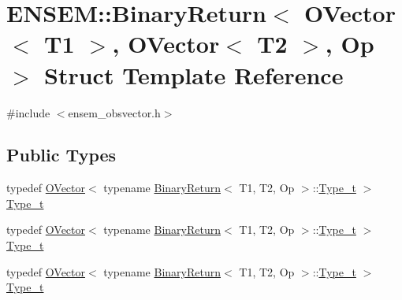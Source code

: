 \hypertarget{structENSEM_1_1BinaryReturn_3_01OVector_3_01T1_01_4_00_01OVector_3_01T2_01_4_00_01Op_01_4}{}\section{E\+N\+S\+EM\+:\+:Binary\+Return$<$ O\+Vector$<$ T1 $>$, O\+Vector$<$ T2 $>$, Op $>$ Struct Template Reference}
\label{structENSEM_1_1BinaryReturn_3_01OVector_3_01T1_01_4_00_01OVector_3_01T2_01_4_00_01Op_01_4}


{\ttfamily \#include $<$ensem\+\_\+obsvector.\+h$>$}

\subsection*{Public Types}
\begin{DoxyCompactItemize}
\item 
typedef \mbox{\hyperlink{classENSEM_1_1OVector}{O\+Vector}}$<$ typename \mbox{\hyperlink{structENSEM_1_1BinaryReturn}{Binary\+Return}}$<$ T1, T2, Op $>$\+::\mbox{\hyperlink{structENSEM_1_1BinaryReturn_3_01OVector_3_01T1_01_4_00_01OVector_3_01T2_01_4_00_01Op_01_4_a4736776d1b4c658230ffbd7a77aa772a}{Type\+\_\+t}} $>$ \mbox{\hyperlink{structENSEM_1_1BinaryReturn_3_01OVector_3_01T1_01_4_00_01OVector_3_01T2_01_4_00_01Op_01_4_a4736776d1b4c658230ffbd7a77aa772a}{Type\+\_\+t}}
\item 
typedef \mbox{\hyperlink{classENSEM_1_1OVector}{O\+Vector}}$<$ typename \mbox{\hyperlink{structENSEM_1_1BinaryReturn}{Binary\+Return}}$<$ T1, T2, Op $>$\+::\mbox{\hyperlink{structENSEM_1_1BinaryReturn_3_01OVector_3_01T1_01_4_00_01OVector_3_01T2_01_4_00_01Op_01_4_a4736776d1b4c658230ffbd7a77aa772a}{Type\+\_\+t}} $>$ \mbox{\hyperlink{structENSEM_1_1BinaryReturn_3_01OVector_3_01T1_01_4_00_01OVector_3_01T2_01_4_00_01Op_01_4_a4736776d1b4c658230ffbd7a77aa772a}{Type\+\_\+t}}
\item 
typedef \mbox{\hyperlink{classENSEM_1_1OVector}{O\+Vector}}$<$ typename \mbox{\hyperlink{structENSEM_1_1BinaryReturn}{Binary\+Return}}$<$ T1, T2, Op $>$\+::\mbox{\hyperlink{structENSEM_1_1BinaryReturn_3_01OVector_3_01T1_01_4_00_01OVector_3_01T2_01_4_00_01Op_01_4_a4736776d1b4c658230ffbd7a77aa772a}{Type\+\_\+t}} $>$ \mbox{\hyperlink{structENSEM_1_1BinaryReturn_3_01OVector_3_01T1_01_4_00_01OVector_3_01T2_01_4_00_01Op_01_4_a4736776d1b4c658230ffbd7a77aa772a}{Type\+\_\+t}}
\end{DoxyCompactItemize}


